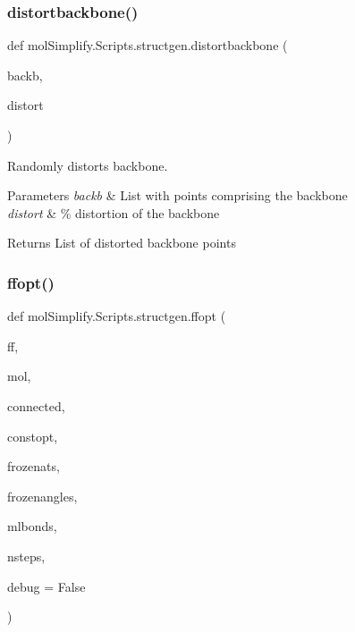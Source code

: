\mbox{\label{namespacemolSimplify_1_1Scripts_1_1structgen_a4f54c3884321f27f7791785de3a348d1}} 
\subsubsection{\texorpdfstring{distortbackbone()}{distortbackbone()}}
{\footnotesize\ttfamily def mol\+Simplify.\+Scripts.\+structgen.\+distortbackbone (\begin{DoxyParamCaption}\item[{}]{backb,  }\item[{}]{distort }\end{DoxyParamCaption})}



Randomly distorts backbone. 


\begin{DoxyParams}{Parameters}
{\em backb} & List with points comprising the backbone \\
\hline
{\em distort} & \% distortion of the backbone \\
\hline
\end{DoxyParams}
\begin{DoxyReturn}{Returns}
List of distorted backbone points 
\end{DoxyReturn}
\mbox{\label{namespacemolSimplify_1_1Scripts_1_1structgen_a1c48077780530e1f82a2048b3e4e47e2}} 
\subsubsection{\texorpdfstring{ffopt()}{ffopt()}}
{\footnotesize\ttfamily def mol\+Simplify.\+Scripts.\+structgen.\+ffopt (\begin{DoxyParamCaption}\item[{}]{ff,  }\item[{}]{mol,  }\item[{}]{connected,  }\item[{}]{constopt,  }\item[{}]{frozenats,  }\item[{}]{frozenangles,  }\item[{}]{mlbonds,  }\item[{}]{nsteps,  }\item[{}]{debug = {\ttfamily False} }\end{DoxyParamCaption})}



